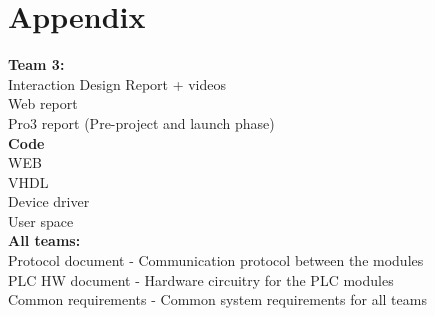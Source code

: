 \chapter{Appendix}
\textbf{Team 3:}
\\Interaction Design Report + videos
\\Web report
\\Pro3 report (Pre-project and launch phase)
\\\textbf{Code}
\\WEB
\\VHDL
\\Device driver
\\User space
\\\textbf{All teams:}
\\Protocol document - Communication protocol between the modules
\\PLC HW document - Hardware circuitry for the PLC modules
\\Common requirements - Common system requirements for all teams
